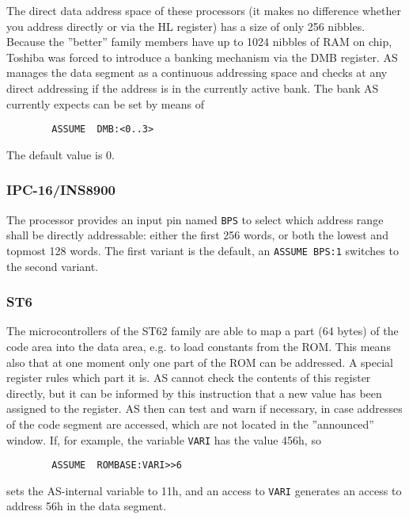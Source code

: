 \documentclass[12pt,twoside]{report}
\newcommand{\tty}[1]{{\tt #1}}
\newcommand{\asname}{{AS}}
\begin{document}
The direct data address space of these processors (it makes no
difference whether you address directly or via the HL register) has a
size of only 256 nibbles.  Because the ''better'' family members have
up to 1024 nibbles of RAM on chip, Toshiba was forced to introduce a
banking mechanism via the DMB register.  \asname{} manages the data segment
as a continuous addressing space and checks at any direct addressing
if the address is in the currently active bank.  The bank \asname{}
currently expects can be set by means of
\begin{verbatim}
        ASSUME  DMB:<0..3>
\end{verbatim}
The default value is 0.


\subsubsection{IPC-16/INS8900}
\label{PACEAssume}

The processor provides an input pin named {\tt BPS} to select which address
range shall be directly addressable: either the first 256 words, or both
the lowest and topmost 128 words.  The first variant is the default, an
{\tt ASSUME BPS:1} switches to the second variant.


\subsubsection{ST6}
\label{ST6Assume}

The microcontrollers of the ST62 family are able to map a part (64 bytes)
of the code area into the data area, e.g. to load constants from the ROM.
This means also that at one moment only one part of the ROM can be
addressed.  A special register rules which part it is.  \asname{} cannot check
the contents of this register directly, but it can be informed by this
instruction that a new value has been assigned to the register.  \asname{} then
can test and warn if necessary, in case addresses of the code segment are
accessed, which are not located in the ''announced'' window.  If, for
example, the variable \tty{VARI} has the value 456h, so
\begin{verbatim}
        ASSUME  ROMBASE:VARI>>6
\end{verbatim}
sets the \asname{}-internal variable to 11h, and an access to \tty{VARI}
generates an access to address 56h in the data segment.
\end{document}
